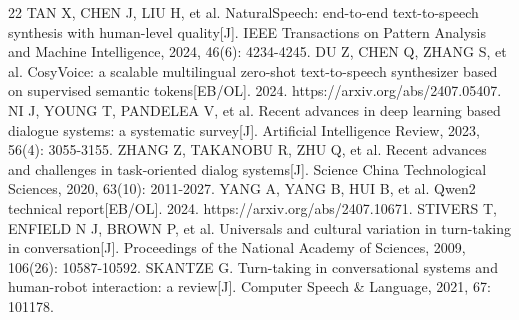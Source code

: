 \documentclass[a4paper,11pt]{article}
\begin{document}
\begin{thebibliography}{22}
 TAN X, CHEN J, LIU H, et al. NaturalSpeech: end-to-end text-to-speech synthesis with human-level quality[J]. IEEE Transactions on Pattern Analysis and Machine Intelligence, 2024, 46(6): 4234-4245.
 DU Z, CHEN Q, ZHANG S, et al. CosyVoice: a scalable multilingual zero-shot text-to-speech synthesizer based on supervised semantic tokens[EB/OL]. 2024. https://arxiv.org/abs/2407.05407.
 NI J, YOUNG T, PANDELEA V, et al. Recent advances in deep learning based dialogue systems: a systematic survey[J]. Artificial Intelligence Review, 2023, 56(4): 3055-3155.
 ZHANG Z, TAKANOBU R, ZHU Q, et al. Recent advances and challenges in task-oriented dialog systems[J]. Science China Technological Sciences, 2020, 63(10): 2011-2027.
 YANG A, YANG B, HUI B, et al. Qwen2 technical report[EB/OL]. 2024. https://arxiv.org/abs/2407.10671.
 STIVERS T, ENFIELD N J, BROWN P, et al. Universals and cultural variation in turn-taking in conversation[J]. Proceedings of the National Academy of Sciences, 2009, 106(26): 10587-10592.
 SKANTZE G. Turn-taking in conversational systems and human-robot interaction: a review[J]. Computer Speech \& Language, 2021, 67: 101178.
\end{thebibliography}
\end{document}
